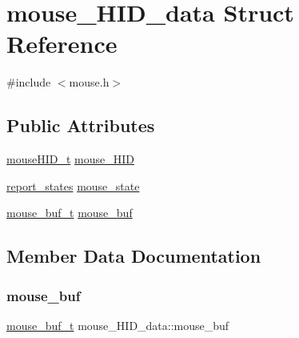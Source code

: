 \hypertarget{structmouse__HID__data}{}\section{mouse\+\_\+\+H\+I\+D\+\_\+data Struct Reference}
\label{structmouse__HID__data}


{\ttfamily \#include $<$mouse.\+h$>$}

\subsection*{Public Attributes}
\begin{DoxyCompactItemize}
\item 
\hyperlink{mouse_8h_aee70866b560d9530d3c2ccc19c21b346}{mouse\+H\+I\+D\+\_\+t} \hyperlink{structmouse__HID__data_aa25203a59480aa1bbf41ef5f20fdffb5}{mouse\+\_\+\+H\+ID}
\item 
\hyperlink{states_8h_a97ae098857b45ee4ac9f7ae3a41a7aff}{report\+\_\+states} \hyperlink{structmouse__HID__data_a26b736ac3bf561f7751d5201a47e913e}{mouse\+\_\+state}
\item 
\hyperlink{mouse_8h_a5fbb3541c2852db119bcde43b746b2ae}{mouse\+\_\+buf\+\_\+t} \hyperlink{structmouse__HID__data_a178c4753df1770290cc0d10badb227c6}{mouse\+\_\+buf}
\end{DoxyCompactItemize}


\subsection{Member Data Documentation}
\mbox{\label{structmouse__HID__data_a178c4753df1770290cc0d10badb227c6}} 
\subsubsection{\texorpdfstring{mouse\+\_\+buf}{mouse\_buf}}
{\footnotesize\ttfamily \hyperlink{mouse_8h_a5fbb3541c2852db119bcde43b746b2ae}{mouse\+\_\+buf\+\_\+t} mouse\+\_\+\+H\+I\+D\+\_\+data\+::mouse\+\_\+buf}

\mbox{\label{structmouse__HID__data_aa25203a59480aa1bbf41ef5f20fdffb5}} 
